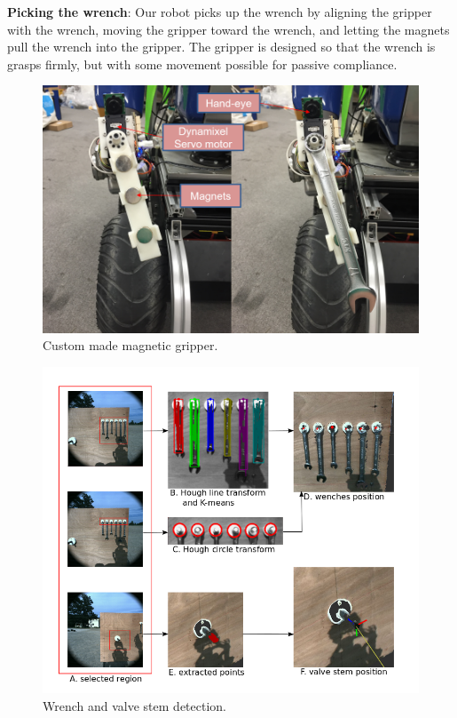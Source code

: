 \documentclass{standalone}
\begin{document}
\textbf{Picking the wrench}: Our robot picks up the wrench by aligning the gripper with the wrench, moving the gripper toward the wrench, and letting the magnets pull the wrench into the gripper. The gripper is designed so that the wrench is grasps firmly, but with some movement possible for passive compliance.

\begin{figure}
  \includegraphics[width=\columnwidth]{sections/task2/images/gripper}
  \caption{Custom made magnetic gripper.}
  \label{fig:figure2}
\end{figure}

\begin{figure}[b]
  \includegraphics[width=\columnwidth]{sections/task2/images/detection}
  \caption{Wrench and valve stem detection.}
  \label{fig:figure3}
\end{figure}
\end{document}
